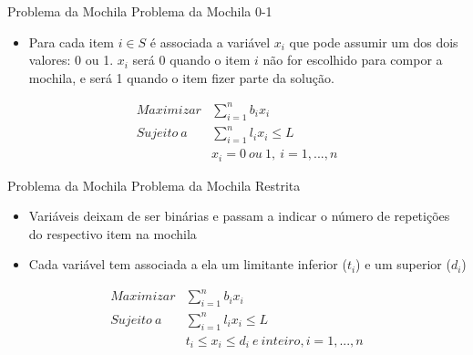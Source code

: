 \documentclass[slidestop,compress,mathserif]{beamer}
\begin{document}
\begin{frame} {Problema da Mochila} {Problema da Mochila 0-1}

\begin{itemize}
\item Para cada item $i \in S$ é associada a variável $x_i$ que pode assumir um dos dois valores: 0 ou 1. $x_i$ será 0 quando o item $i$ não for escolhido para compor a mochila, e será 1 quando o item fizer parte da solução.
\end{itemize}

\begin{eqnarray}
	Maximizar & \displaystyle \sum_{i = 1}^{n} b_ix_i \\
	Sujeito \ a & \displaystyle \sum_{i = 1}^{n} l_ix_i \leq L \\
	& x_i = 0 \ ou \ 1, \ i = 1, ..., n \nonumber
\end{eqnarray}
\end{frame}






\begin{frame} {Problema da Mochila} {Problema da Mochila Restrita}

\begin{itemize}
 \item Variáveis deixam de ser binárias e passam a indicar o número de repetições do respectivo item na mochila
 \item Cada variável tem associada a ela um limitante inferior ($t_i$) e um superior ($d_i$)
\end{itemize}

\begin{eqnarray}
	Maximizar & \displaystyle \sum_{i=1}^n b_i x_i \\
	Sujeito \ a & \displaystyle \sum_{i=1}^n l_i x_i  \leq L \\
	&  t_i \leq x_i \leq d_i \ e \ inteiro, i=1,...,n  \nonumber
\end{eqnarray}

\end{frame}
\end{document}
